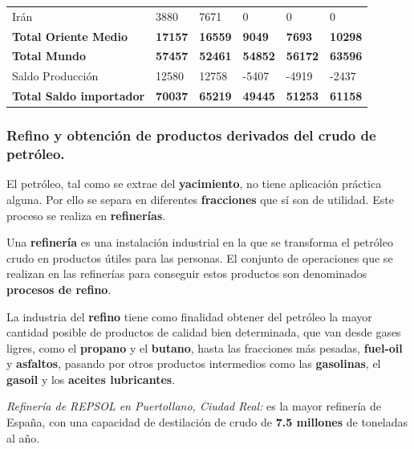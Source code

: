 \begin{table}[H]
\begin{tabular}{llllll}
					Irán	&	3880	&	7671	&	0	&	0	&	0	\\
					\textbf{Total Oriente Medio}	&	\textbf{17157}	&	\textbf{16559}	&	\textbf{9049}	&	\textbf{7693}	&	\textbf{10298}	\\
					\hline
					\textbf{Total Mundo}	&	\textbf{57457}	&	\textbf{52461}	&	\textbf{54852}	&	\textbf{56172}	&	\textbf{63596}	\\
					\hline
					Saldo Producción	&	12580	&	12758	&	-5407	&	-4919	&	-2437	\\
					\textbf{Total Saldo importador}	&	\textbf{70037}	&	\textbf{65219}	&	\textbf{49445}	&	\textbf{51253}	&	\textbf{61158} \\
					\hline
					
				\end{tabular}
			\end{table}
			
		\subsubsection{Refino y obtención de productos derivados del crudo de petróleo.}
			El petróleo, tal como se extrae del \textbf{yacimiento}, no tiene aplicación práctica alguna. Por ello se separa en diferentes \textbf{fracciones} que sí son de utilidad. Este proceso se realiza en \textbf{refinerías}.
			
			
			Una \textbf{refinería} es una instalación industrial en la que se transforma el petróleo crudo en productos útiles para las personas. El conjunto de operaciones que se realizan en las refinerías para conseguir estos productos son denominados \textbf{procesos de refino}.
			
			
			La industria del \textbf{refino} tiene como finalidad obtener del petróleo la mayor cantidad posible de productos de calidad bien determinada, que van desde gases ligres, como el \textbf{propano} y el \textbf{butano}, hasta las fracciones más pesadas, \textbf{fuel-oil} y \textbf{asfaltos}, pasando por otros productos intermedios como las \textbf{gasolinas}, el \textbf{gasoil} y los \textbf{aceites lubricantes}.
			
			
			\textit{Refinería de REPSOL en Puertollano, Ciudad Real:} es la mayor refinería de España, con una capacidad de destilación de crudo de \textbf{7.5 millones} de toneladas al año.
			
